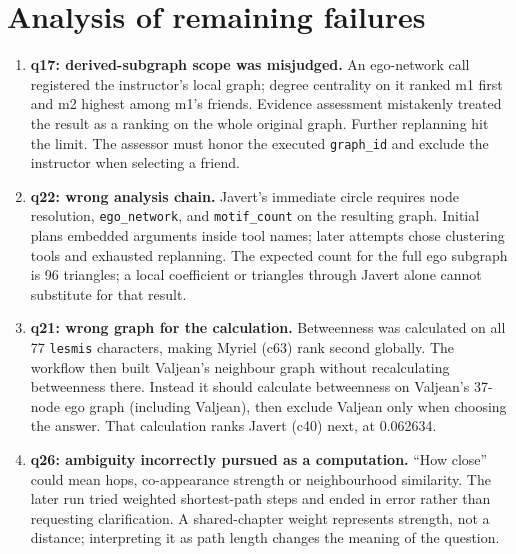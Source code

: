 \documentclass[10pt,a4paper]{article}
\newcommand{\tool}[1]{\texttt{#1}}
\begin{document}
\section{Analysis of remaining failures}
\begin{enumerate}
\item \textbf{q17: derived-subgraph scope was misjudged.} An ego-network call registered the instructor's
  local graph; degree centrality on it ranked m1 first and m2 highest among m1's friends. Evidence
  assessment mistakenly treated the result as a ranking on the whole original graph. Further replanning
  hit the limit. The assessor must honor the executed \tool{graph\_id} and exclude the instructor when
  selecting a friend.
\item \textbf{q22: wrong analysis chain.} Javert's immediate circle requires node resolution,
  \tool{ego\_network}, and \tool{motif\_count} on the resulting graph. Initial plans embedded arguments
  inside tool names; later attempts chose clustering tools and exhausted replanning. The expected count
  for the full ego subgraph is 96 triangles; a local coefficient or triangles through Javert alone
  cannot substitute for that result.
\item \textbf{q21: wrong graph for the calculation.} Betweenness was calculated on all 77
  \tool{lesmis} characters, making Myriel (c63) rank second globally. The workflow then built
  Valjean's neighbour graph without recalculating betweenness there. Instead it should calculate
  betweenness on Valjean's 37-node ego graph (including Valjean), then exclude Valjean only when
  choosing the answer. That calculation ranks Javert (c40) next, at 0.062634.
\item \textbf{q26: ambiguity incorrectly pursued as a computation.} ``How close'' could mean hops,
  co-appearance strength or neighbourhood similarity. The later run tried weighted shortest-path
  steps and ended in error rather than requesting clarification. A shared-chapter weight represents
  strength, not a distance; interpreting it as path length changes the meaning of the question.
\end{enumerate}

\clearpage
\end{document}
